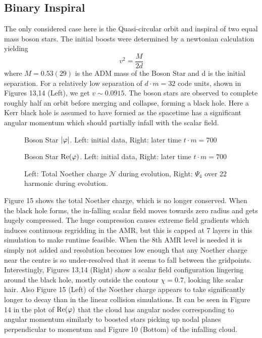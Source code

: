 \subsection{Binary Inspiral}
The only considered case here is the Quasi-circular orbit and inspiral of two equal mass boson stars. The initial boosts were determined by a newtonian calculation yielding 
\begin{equation} v^2 = \frac{M}{2d}\end{equation}
where $M=0.53(29)$ is the ADM mass of the Boson Star and d is the initial separation. For a relatively low separation of $d\cdot m =32$ code units, shown in Figures 13,14 (Left), we get $v \sim 0.0915$. The boson stars are observed to complete roughly half an orbit before merging and collapse, forming a black hole. Here a Kerr black hole is assumed to have formed as the spacetime has a significant angular momentum which should partially infall with the scalar field. 

  \begin{figure}[h!]
  \caption{Boson Star $|\varphi|$. Left: initial data, Right: later time $t \cdot m = 700$}
  \centering
  \hfill
\end{figure}
  \begin{figure}[h!]
  \caption{Boson Star $\Re(\varphi)$. Left: initial data, Right: later time $t \cdot m = 700$}
  \centering
  \hfill
\end{figure}
  \begin{figure}[h!]
  \caption{Left: Total Noether charge $\mathcal{N}$ during evolution, Right: $\Psi_4$ over 22 harmonic during evolution.}
  \centering
  \hfill
\end{figure}
Figure 15 shows the total Noether charge, which is no longer conserved. When the black hole forms, the in-falling scalar field moves towards zero radius and gets hugely compressed. The huge compression causes extreme field gradients which induces continuous regridding in the AMR, but this is capped at 7 layers in this simulation to make runtime feasible. When the 8th AMR level is needed it is simply not added and resolution becomes low enough that any Noether charge near the centre is so under-resolved that it seems to fall between the gridpoints. Interestingly, Figures 13,14 (Right) show a scalar field configuration lingering around the black hole, mostly outside the contour $\chi=0.7$, looking like scalar hair. Also Figure 15 (Left) of the Noether charge appears to take significantly longer to decay than in the linear collision simulations. It can be seen in Figure 14 in the plot of $\Re(\varphi)$ that the cloud has angular nodes corresponding to angular momentum similarly to boosted stars picking up nodal planes perpendicular to momentum and Figure 10 (Bottom) of the infalling cloud. 

